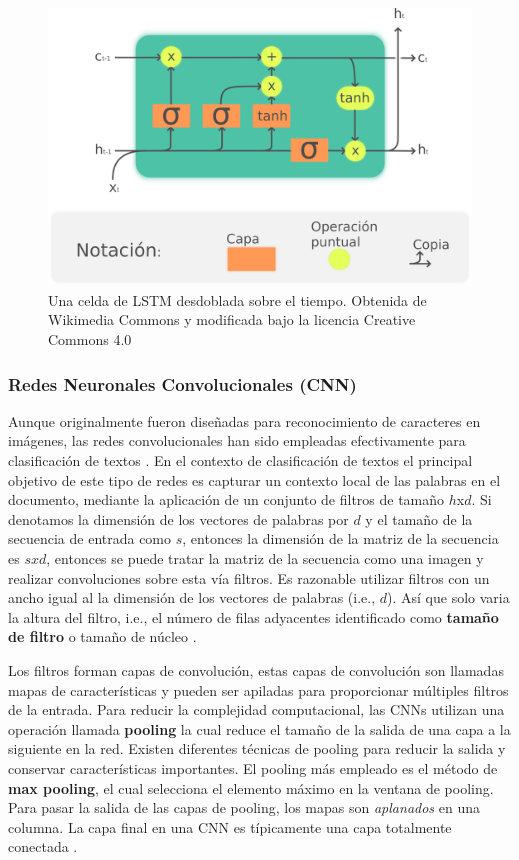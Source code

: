 \begin{figure}[!t]
\centering
\includegraphics[width=0.7 \textwidth]{sections/figures/LSTM_cell2.png}
\caption{Una celda de LSTM desdoblada sobre el tiempo. Obtenida de Wikimedia Commons y modificada bajo la licencia Creative Commons 4.0} \label{fig:LSTM}
\end{figure}


\subsubsection{Redes Neuronales Convolucionales (CNN)}
Aunque originalmente fueron diseñadas para reconocimiento de caracteres en imágenes, las redes convolucionales han sido empleadas efectivamente para clasificación de textos \citep{kim2014convolutional, zhang2015character, zhang2015sensitivity, conneau2016very}.
En el contexto de clasificación de textos el principal objetivo de este tipo de redes es capturar un contexto local de las palabras en el documento, mediante la aplicación de un conjunto de filtros de tamaño $h$x$d$. Si denotamos la dimensión de los vectores de palabras por $d$ y el tamaño de la secuencia de entrada como $s$, entonces la dimensión de la matriz de la secuencia es $s x d$, entonces se puede tratar la matriz de la secuencia como una imagen y realizar convoluciones sobre esta vía filtros. Es razonable utilizar filtros con un ancho igual al la dimensión de los vectores de palabras (i.e., $d$). Así que solo varia la altura del filtro, i.e., el número de filas adyacentes identificado como \textbf{tamaño de filtro} o tamaño de núcleo \cite{zhang2015sensitivity}. 

Los filtros forman capas de convolución, estas capas de convolución son llamadas mapas de características y pueden ser apiladas para proporcionar múltiples filtros de la entrada. Para reducir la complejidad computacional, las CNNs utilizan una operación llamada \textbf{pooling} la cual reduce el tamaño de la salida de una capa a la siguiente en la red. Existen diferentes técnicas de pooling para reducir la salida y conservar características importantes. El pooling más empleado es el método de \textbf{max pooling}, el cual selecciona el elemento máximo en la ventana de pooling. Para pasar la salida de las capas de pooling, los mapas son \textit{aplanados} en una columna. La capa final en una CNN es típicamente una capa totalmente conectada \cite{kowsari2019text}.
